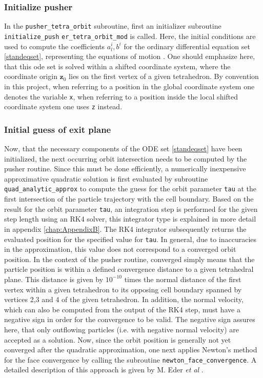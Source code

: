 \documentclass[./main.tex]{subfiles}
\begin{document}
\subsubsection{Initialize pusher} 
In the \texttt{pusher\_tetra\_orbit} subroutine, first an initializer subroutine \texttt{initialize\_push}
\texttt{er\_tetra\_orbit\_mod} is called. Here, the initial conditions are used to compute the coefficients $a^i_l, b^i$ for the ordinary differential equation set \ref{standeqset}, representing the equations of motion \cite{Eder_DA}. One should emphasize here, that this ode set is solved within a shifted coordinate system, where the coordinate origin $\textbf{z}_0$ lies on the first vertex of a given tetrahedron. By convention in this project, when referring to a position in the global coordinate system one denotes the variable \texttt{x}, when referring to a position inside the local shifted coordinate system one uses \texttt{z} instead.
\subsubsection{Initial guess of exit plane}
Now, that the necessary components of the ODE set \ref{standeqset} have been initialized, the next occurring orbit intersection needs to be computed by the pusher routine. Since this must be done efficiently, a numerically inexpensive approximative quadratic solution is first evaluated by subroutine \texttt{quad\_analytic\_approx} to compute the guess for the orbit parameter \texttt{tau} at the first intersection of the particle trajectory with the cell boundary. Based on the result for the orbit parameter \texttt{tau}, an integration step is performed for the given step length using an RK4 solver, this integrator type is explained in more detail in appendix \ref{chap:AppendixB}. The RK4 integrator subsequently returns the evaluated position for the specified value for \texttt{tau}. In general, due to inaccuracies in the approximation, this value does not correspond to a converged orbit position. In the context of the pusher routine, converged simply means that the particle position is within a defined convergence distance to a given tetrahedral plane. This distance is given by $10^{-10}$ times the normal distance of the first vertex within a given tetrahedron to its opposing cell boundary spanned by vertices 2,3 and 4 of the given tetrahedron. In addition, the normal velocity, which can also be computed from the output of the RK4 step, must have a negative sign in order for the convergence to be valid. The negative sign assures here, that only outflowing particles (i.e. with negative normal velocity) are accepted as a solution.  
Now, since the orbit position is generally not yet converged after the quadratic approximation, one next applies Newton's method for the face convergence by calling the subroutine \texttt{newton\_face\_convergence}. A detailed description of this approach is given by M. Eder \textit{et al} \cite{Eder_DA}. 
\end{document}
